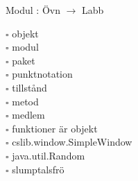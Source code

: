 
    Modul : Övn  $\rightarrow$ Labb 
    \begin{multicols}{3}\SlideFontTiny
    $\square$ objekt \\
$\square$ modul \\
$\square$ paket \\
$\square$ punktnotation \\
$\square$ tillstånd \\
$\square$ metod \\
$\square$ medlem \\
$\square$ funktioner är objekt \\
$\square$ cslib.window.SimpleWindow \\
$\square$ java.util.Random \\
$\square$ slumptalsfrö \\
    \end{multicols}
    